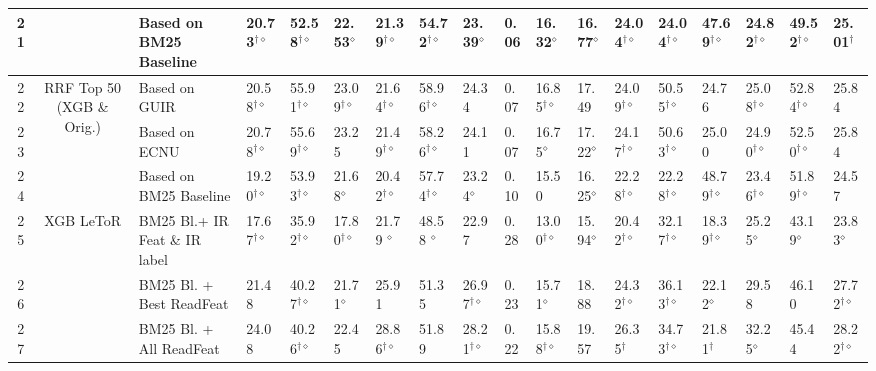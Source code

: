 \begin{table*}
{\begin{tabular}{ccllllllllllllllll}
21  &  & Based on BM25 Baseline  & 20.73$^{\dagger\diamond}$ & 52.58$^{\dagger\diamond}$ & 22.53$^{\diamond}$  & 21.39$^{\dagger\diamond}$ & 54.72$^{\dagger\diamond}$ & 23.39$^{\diamond}$  & 0.06 & 16.32$^{\diamond}$  & 16.77$^{\diamond}$ & 24.04$^{\dagger\diamond}$ & 24.04$^{\dagger\diamond}$ & 47.69$^{\dagger\diamond}$ & 24.82$^{\dagger\diamond}$ & 49.52$^{\dagger\diamond}$ & 25.01$^{\dagger}$ \tabularnewline
\midrule 
22 & \multirow{3}{*}{RRF Top 50 (XGB \& Orig.)} & Based on GUIR  & 20.58$^{\dagger\diamond}$ & 55.91$^{\dagger\diamond}$ & 23.09$^{\dagger\diamond}$ & 21.64$^{\dagger\diamond}$ & 58.96$^{\dagger\diamond}$ & 24.34 & 0.07 & 16.85$^{\dagger\diamond}$ & 17.49 & 24.09$^{\dagger\diamond}$ & 50.55$^{\dagger\diamond}$ & 24.76 & 25.08$^{\dagger\diamond}$ & 52.84$^{\dagger\diamond}$ & 25.84\tabularnewline
23  &  & Based on ECNU  & 20.78$^{\dagger\diamond}$ & 55.69$^{\dagger\diamond}$ & 23.25  & 21.49$^{\dagger\diamond}$ & 58.26$^{\dagger\diamond}$ & 24.11 & 0.07 & 16.75$^{\diamond}$  & 17.22$^{\diamond}$ & 24.17$^{\dagger\diamond}$ & 50.63$^{\dagger\diamond}$ & 25.00 & 24.90$^{\dagger\diamond}$ & 52.50$^{\dagger\diamond}$ & 25.84 \tabularnewline
24  &  & Based on BM25 Baseline  & 19.20$^{\dagger\diamond}$ & 53.93$^{\dagger\diamond}$ & 21.68$^{\diamond}$  & 20.42$^{\dagger\diamond}$ & 57.74$^{\dagger\diamond}$ & 23.24$^{\diamond}$ & 0.10 & 15.50  & 16.25$^{\diamond}$ & 22.28$^{\dagger\diamond}$ & 22.28$^{\dagger\diamond}$ & 48.79$^{\dagger\diamond}$ & 23.46$^{\dagger\diamond}$ & 51.89$^{\dagger\diamond}$ & 24.57\tabularnewline
\midrule 
25 & \multirow{3}{*}{XGB LeToR} & BM25 Bl.+ IR Feat \& IR label  & 17.67$^{\dagger\diamond}$ & 35.92$^{\dagger\diamond}$ & 17.80$^{\dagger\diamond}$ & 21.79 $^{\diamond}$  & 48.58 $^{\diamond}$  & 22.97  & 0.28 & 13.00$^{\dagger\diamond}$ & 15.94$^{\diamond}$  & 20.42$^{\dagger\diamond}$ & 32.17$^{\dagger\diamond}$ & 18.39$^{\dagger\diamond}$ & 25.25$^{\diamond}$ & 43.19$^{\diamond}$  & 23.83$^{\diamond}$\tabularnewline
26  &  & BM25 Bl. + Best ReadFeat  & 21.48  & 40.27$^{\dagger\diamond}$ & 21.71$^{\diamond}$  & 25.91  & 51.35  & 26.97$^{\dagger\diamond}$ & 0.23 & 15.71$^{\diamond}$  & 18.88  & 24.32$^{\dagger\diamond}$ & 36.13$^{\dagger\diamond}$ & 22.12$^{\diamond}$  & 29.58  & 46.10  & 27.72$^{\dagger\diamond}$\tabularnewline
27  &  & BM25 Bl. + All ReadFeat  & 24.08  & 40.26$^{\dagger\diamond}$ & 22.45  & 28.86$^{\dagger\diamond}$ & 51.89  & 28.21$^{\dagger\diamond}$ & 0.22 & 15.88$^{\dagger\diamond}$ & 19.57  & 26.35$^{\dagger}$  & 34.73$^{\dagger\diamond}$ & 21.81$^{\dagger}$  & 32.25$^{\diamond}$  & 45.44  & 28.22$^{\dagger\diamond}$\tabularnewline
\bottomrule
\end{tabular}} %
\end{table*}
